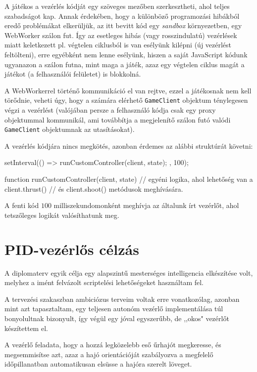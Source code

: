 A játékos a vezérlés kódját egy szöveges mezőben szerkesztheti, ahol teljes
szabadságot kap. Annak érdekében, hogy a különböző programozási hibákból eredő
problémákat elkerüljük, az itt bevitt kód egy \emph{sandbox} környezetben, egy
WebWorker szálon fut. Így az esetleges hibás (vagy rosszindulatú) vezérlések
miatt keletkezett pl. végtelen ciklusból is van esélyünk kilépni (új vezérlést
feltölteni), erre egyébként nem lenne esélyünk, hiszen a saját JavaScript kódunk
ugyanazon a szálon futna, mint maga a játék, azaz egy végtelen ciklus magát a
játékot (a felhasználói felületet) is blokkolná.

A WebWorkerrel történő kommunikáció el van rejtve, ezzel a játékosnak nem kell
törődnie, veheti úgy, hogy a számára elérhető \texttt{GameClient} objektum
ténylegesen végzi a vezérlést (valójában persze a felhasználó kódja csak egy
proxy objektummal kommunikál, ami továbbítja a megjelenítő szálon futó valódi
\texttt{GameClient} objektumnak az utasításokat).

A vezérlés kódjára nincs megkötés, azonban érdemes az alábbi struktúrát követni:

\begin{js}
setInterval(() => {
  runCustomController(client, state);
}, 100);

function runCustomController(client, state) {
  // egyéni logika, ahol lehetőség van a client.thrust()
  // és client.shoot() metódusok meghívására.
}
\end{js}

A fenti kód $100$ milliszekundomonként meghívja az általunk írt vezérlőt, ahol
tetszőleges logikát valósíthatunk meg.

\section{PID-vezérlős célzás}

A diplomaterv egyik célja egy alapszintű mesterséges intelligencia elkészítése
volt, melyhez a imént felvázolt scriptelési lehetőségeket használtam fel.

A tervezési szakaszban ambiciózus terveim voltak erre vonatkozólag, azonban mint
azt tapasztaltam, egy teljesen autonóm vezérlő implementálása túl bonyolultnak
bizonyult, így végül egy jóval egyszerűbb, de ,,okos" vezérlőt készítettem el.

A vezérlő feladata, hogy a hozzá legközelebb eső űrhajót megkeresse, és
megsemmisítse azt, azaz a hajó orientációját szabályozva a megfelelő
időpillanatban automatikusan elsüsse a hajóra szerelt löveget.

